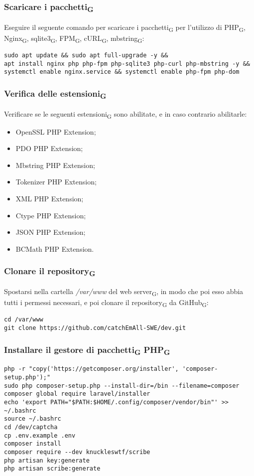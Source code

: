 \subsubsection{Scaricare i pacchetti\textsubscript{G}}
Eseguire il seguente comando per scaricare i pacchetti\textsubscript{G} per l'utilizzo di PHP\textsubscript{G}, Nginx\textsubscript{G}, sqlite3\textsubscript{G}, FPM\textsubscript{G}, cURL\textsubscript{G}, mbstring\textsubscript{G}:
\begin{verbatim}
sudo apt update && sudo apt full-upgrade -y && 
apt install nginx php php-fpm php-sqlite3 php-curl php-mbstring -y && 
systemctl enable nginx.service && systemctl enable php-fpm php-dom
\end{verbatim}

\subsubsection{Verifica delle estensioni\textsubscript{G}}
Verificare se le seguenti estensioni\textsubscript{G} sono abilitate, e in caso contrario abilitarle:
\begin{itemize}
	\item OpenSSL PHP Extension;
	\item PDO PHP Extension;
 \item Mbstring PHP Extension;
 \item Tokenizer PHP Extension;
 \item XML PHP Extension;
 \item Ctype PHP Extension;
 \item JSON PHP Extension;
 \item BCMath PHP Extension.
\end{itemize}   

\subsubsection{Clonare il repository\textsubscript{G}}
Spostarsi nella cartella \textit{/var/www} del web server\textsubscript{G}, in modo che poi esso abbia tutti i permessi necessari, e poi clonare il repository\textsubscript{G} da GitHub\textsubscript{G}:
\begin{verbatim}
cd /var/www
git clone https://github.com/catchEmAll-SWE/dev.git
\end{verbatim}

\subsubsection{Installare il gestore di pacchetti\textsubscript{G} PHP\textsubscript{G}}
\begin{verbatim}
php -r "copy('https://getcomposer.org/installer', 'composer-setup.php');"
sudo php composer-setup.php --install-dir=/bin --filename=composer
composer global require laravel/installer
echo 'export PATH="$PATH:$HOME/.config/composer/vendor/bin"' >> ~/.bashrc
source ~/.bashrc
cd /dev/captcha
cp .env.example .env
composer install
composer require --dev knuckleswtf/scribe
php artisan key:generate
php artisan scribe:generate
\end{verbatim}


